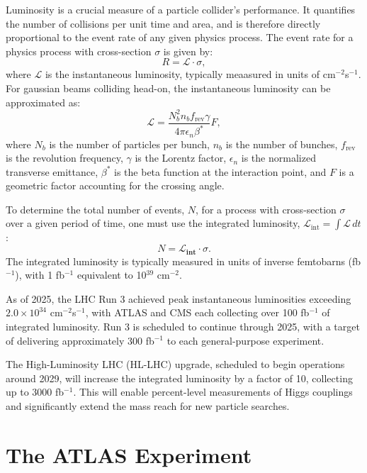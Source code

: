 Luminosity is a crucial measure of a particle collider's performance. It quantifies the number of collisions per unit time and area, and is therefore directly proportional to the event rate of any given physics process. The event rate for a physics process with cross-section $\sigma$ is given by:
\begin{equation}
R = \mathcal{L} \cdot \sigma,
\end{equation}
where $\mathcal{L}$ is the instantaneous luminosity, typically meaasured in units of cm$^{-2}$s$^{-1}$. For gaussian beams colliding head-on, the instantaneous luminosity can be approximated as:
\begin{equation}
\mathcal{L} = \frac{N_b^2 n_b f_{\text{rev}} \gamma}{4\pi \epsilon_n \beta^*} F,
\end{equation}
where $N_b$ is the number of particles per bunch, $n_b$ is the number of bunches, $f_{\text{rev}} $ is the revolution frequency, $\gamma$ is the Lorentz factor, $\epsilon_n$ is the normalized transverse emittance, $\beta^*$ is the beta function at the interaction point, and $F$ is a geometric factor accounting for the crossing angle. 

To determine the total number of events, $N$, for a process with cross-section $\sigma$ over a given period of time, one must use the integrated luminosity, $\mathcal{L}_\text{int}=\int \mathcal{L} \,dt$:
\begin{equation}
N = \mathcal{L}_\textbf{int} \cdot \sigma.
\end{equation}
The integrated luminosity is typically measured in units of inverse femtobarns (fb$^{-1}$), with 1 fb$^{-1}$ equivalent to 10$^{39}$ cm$^{-2}$.

As of 2025, the LHC Run 3 achieved peak instantaneous luminosities exceeding $2.0 \times 10^{34}$ cm$^{-2}$s$^{-1}$, with ATLAS and CMS each collecting over 100 fb$^{-1}$ of integrated luminosity. Run 3 is scheduled to continue through 2025, with a target of delivering approximately 300 fb$^{-1}$ to each general-purpose experiment.

The High-Luminosity LHC (HL-LHC) upgrade, scheduled to begin operations around 2029, will increase the integrated luminosity by a factor of 10, collecting up to 3000 fb$^{-1}$. This will enable percent-level measurements of Higgs couplings and significantly extend the mass reach for new particle searches.

\section{The ATLAS Experiment}

